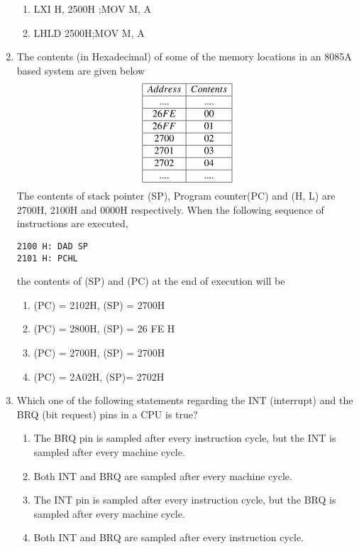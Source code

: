 \documentclass[journal,12pt,twocolumn]{IEEEtran}
\begin{document}
\begin{enumerate}
\begin{enumerate}
      \item LXI H, 2500H ;MOV M, A
      \item LHLD 2500H;MOV M, A
    \end{enumerate}
    \item The contents (in Hexadecimal) of some of the memory locations in an 8085A based system are
given below\\
\begin{displaymath}
\begin{array}{|c|c|} \hline
Address & Contents  \\\hline
....  & ....      \\\hline
26FE  &  00       \\\hline
26FF & 01         \\\hline
2700 & 02         \\\hline
2701 & 03         \\\hline
2702 & 04         \\\hline
....  & ....      \\\hline
\end{array}
\end{displaymath}
The contents of stack pointer (SP), Program counter(PC) and (H, L) are 2700H, 2100H and
0000H respectively. When the following sequence of instructions are executed,\\
\begin{verbatim}
2100 H: DAD SP
2101 H: PCHL
\end{verbatim}
the contents of (SP) and (PC) at the end of execution will be\\
     \begin{enumerate}
      \item (PC) = 2102H, (SP) = 2700H 
      \item (PC) = 2800H, (SP) = 26 FE H 
      \item (PC) = 2700H, (SP) = 2700H 
      \item (PC) = 2A02H, (SP)= 2702H
    \end{enumerate}
    \item Which one of the following statements regarding the INT (interrupt) and the BRQ (bit request)
pins in a CPU is true?\\


%
                 
         \begin{enumerate}
         \item The BRQ pin is sampled after every instruction cycle, but the INT is sampled after every
machine cycle.
         \item Both INT and BRQ are sampled after every machine cycle.
         \item The INT pin is sampled after every instruction cycle, but the BRQ is sampled after every
machine cycle.
         \item Both INT and BRQ are sampled after every instruction cycle.
         \end{enumerate}
              

\end{enumerate}
\end{document}
